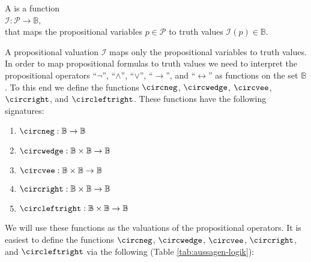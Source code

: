 \begin{Definition}
  A 
   is a function \\[0.2cm]
  \hspace*{1.3cm} $\mathcal{I}:\mathcal{P} \rightarrow \mathbb{B}$, \\[0.2cm]
  that maps the propositional variables  $p\in \mathcal{P}$ to truth values $\mathcal{I}(p) \in \mathbb{B}$.
  \eox
\end{Definition}

A propositional valuation $\mathcal{I}$ maps only the propositional variables to truth values.
In order to map propositional formulas to truth values we need to interpret the propositional operators 
``$\neg$'', ``$\wedge$'', ``$\vee$'', ``$\rightarrow$'', and
``$\leftrightarrow$'' as functions on the set $\mathbb{B}$.  To this end we define the functions
$\circneg$, $\circwedge$, $\circvee$, $\circright$, and $\circleftright$.
These functions have the following signatures:
\begin{enumerate}
\item $\circneg: \mathbb{B} \rightarrow \mathbb{B}$ \index{$\circneg$}
\item $\circwedge: \mathbb{B} \times \mathbb{B} \rightarrow \mathbb{B}$ \index{$\circwedge$}
\item $\circvee: \mathbb{B} \times \mathbb{B} \rightarrow \mathbb{B}$ \index{$\circvee$}
\item $\circright: \mathbb{B} \times \mathbb{B} \rightarrow \mathbb{B}$ \index{$\circright$}
\item $\circleftright: \mathbb{B} \times \mathbb{B} \rightarrow \mathbb{B}$ \index{$\circleftright$}
\end{enumerate}
We will use these functions as the valuations of the propositional operators.
It is easiest to define the functions $\circneg$, $\circwedge$, $\circvee$, $\circright$, and $\circleftright$
via the following   (Table \ref{tab:aussagen-logik}):   


